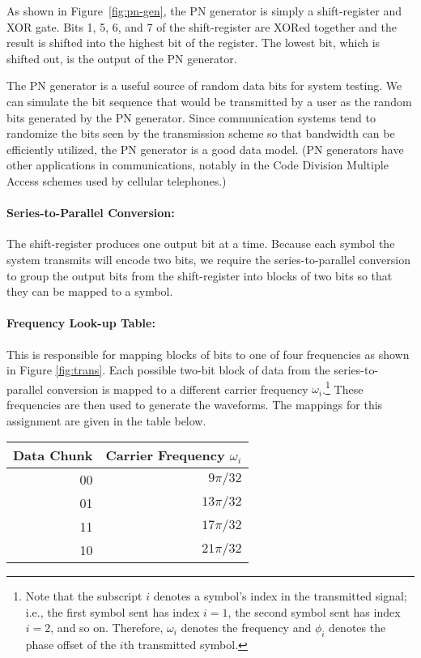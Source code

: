 As shown in Figure~\ref{fig:pn-gen}, the PN generator is simply a
shift-register and XOR gate.  Bits 1, 5, 6, and 7 of the
shift-register are XORed together and the result is shifted
into the highest bit of the register.  The lowest bit, which
is shifted out, is the output of the PN generator.

The PN generator is a useful source of random data bits for
system testing.  We can simulate the bit sequence that would
be transmitted by a user as the random bits generated by the
PN generator.  Since communication systems tend to randomize
the bits seen by the transmission scheme so that bandwidth
can be efficiently utilized, the PN generator is a good data
model.  (PN generators have other applications in communications,
notably in the Code Division Multiple Access schemes used 
by cellular telephones.)

\paragraph{Series-to-Parallel Conversion:} 
The shift-register produces one output bit at a time.  Because each 
symbol the system transmits will encode two bits, we require the 
series-to-parallel conversion to group the output bits from 
the shift-register into blocks of two bits so that they can be mapped 
to a symbol. 

\paragraph{Frequency Look-up Table:} 
This is responsible for mapping blocks of bits to one 
of four frequencies as shown in Figure \ref{fig:trans}. Each 
possible two-bit block of data from the series-to-parallel conversion 
is mapped to a different carrier frequency $\omega_i$.\footnote{Note 
that the subscript $i$ denotes a symbol's index in the transmitted signal; 
i.e., the first symbol sent has index $i=1$, the second symbol sent has 
index $i=2$, and so on.  Therefore, $\omega_i$ denotes the frequency and 
$\phi_i$ denotes the phase offset of the $i$th transmitted symbol.} These 
frequencies are then used to generate the waveforms.  The mappings for 
this assignment are given in the table below.

\begin{tabular}{|r|r|} 
\hline
Data Chunk & Carrier Frequency $\omega_i$\\ \hline\hline
00 & $9\pi/32$\\ \hline 
01 & $13\pi/32$\\ \hline 
11 & $17\pi/32$\\ \hline 
10 & $21\pi/32$\label{table}\\ \hline 
\end{tabular}

